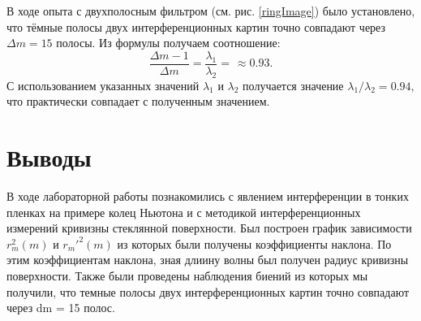 \documentclass[a4paper,12pt]{article} %
\begin{document}
В ходе опыта с двухполосным фильтром (см. рис. \ref{ringImage}) было установлено, что тёмные полосы двух интерференционных картин точно совпадают через $\Delta m = 15$ полосы. Из формулы получаем соотношение:
$$
\frac{\Delta m - 1}{\Delta m} = \frac{\lambda_1}{\lambda_2} = \frac{}{} \approx 0.93.
$$
С использованием указанных значений $\lambda_1$ и $\lambda_2$ получается значение $\lambda_1/\lambda_2 = 0.94$, что практически совпадает с полученным значением.

\section{Выводы}
В ходе лабораторной работы познакомились с явлением интерференции в тонких пленках на примере колец Ньютона и с методикой интерференционных измерений кривизны стеклянной поверхности.
Был построен график зависимости $r_{m}^{2}(m)$ и $r_{m}'^{2}(m)$ из которых были получены коэффициенты наклона. По этим коэффициентам наклона, зная длиину волны был получен радиус кривизны поверхности.
Также были проведены наблюдения биений из которых мы получили, что темные полосы двух интерференционных картин точно совпадают через dm = 15 полос.
\end{document}
